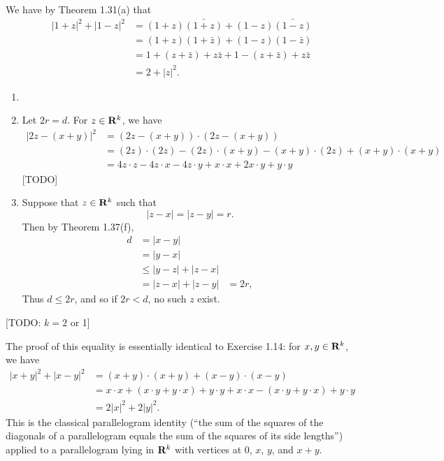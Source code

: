 \begin{ex}
We have by Theorem 1.31(a) that
\begin{align*}
|1 + z|^2 + |1-z|^2 & = (1 + z)\bar{(1 + z)} + (1 - z)\bar{(1 - z)}\\
& = (1 + z)(1 + \bar{z}) + (1 - z)(1 - \bar{z})\\
& = 1 + (z + \bar{z}) + z\bar{z} + 1 - (z + \bar{z}) + z\bar{z}\\
& = 2 + |z|^2.
\end{align*}
\end{ex}

\begin{ex}
[TODO]
\end{ex}

\begin{ex}
\begin{enumerate}
\item [TODO]

\item Let $2r = d$. For $z \in \mathbf{R}^k$, we have
\begin{align*}
|2z - (x+y)|^2 & = (2z - (x + y))\cdot(2z - (x+y))\\
& = (2z)\cdot(2z) - (2z)\cdot(x+y) - (x+y)\cdot(2z) + (x+y)\cdot(x+y)\\
& = 4z\cdot z - 4z\cdot x - 4z\cdot y + x\cdot x + 2x\cdot y + y\cdot y
\end{align*}
[TODO]

\item Suppose that $z \in \mathbf{R}^k$ such that \[|z-x| = |z-y| = r.\] Then by Theorem 1.37(f),
\begin{align*}
d & = |x - y|\\
& = |y - x|\\
& \leq |y - z| + |z - x|\\
& = |z - x| + |z - y|
& = 2r,
\end{align*}
Thus $d \leq 2r$, and so if $2r < d$, no such $z$ exist.
\end{enumerate}
[TODO: $k = 2$ or 1]
\end{ex}

\begin{ex}
The proof of this equality is essentially identical to Exercise 1.14: for $x, y \in \mathbf{R}^k$, we have
\begin{align*}
|x + y|^2 + |x - y|^2 & = (x + y)\cdot(x + y) + (x - y)\cdot(x - y)\\
& = x\cdot x + (x\cdot y + y\cdot x) + y\cdot y + x\cdot x - (x\cdot y + y\cdot x) + y\cdot y\\
& = 2|x|^2 + 2|y|^2.
\end{align*}
This is the classical parallelogram identity (``the sum of the squares of the diagonals of a parallelogram equals the sum of the squares of its side lengths'') applied to a parallelogram lying in $\mathbf{R}^k$ with vertices at 0, $x$, $y$, and $x + y$.
\end{ex}

